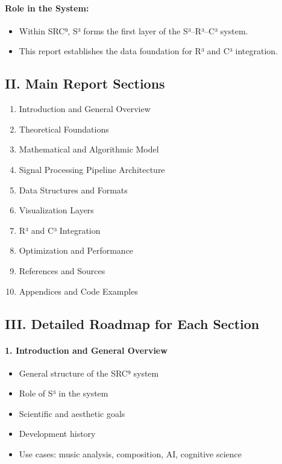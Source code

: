 \paragraph{Role in the System:}

\begin{itemize}
    \item Within SRC⁹, S³ forms the first layer of the S³–R³–C³ system.
    \item This report establishes the data foundation for R³ and C³ integration.
\end{itemize}

\subsection*{II. Main Report Sections}

\begin{enumerate}
    \item Introduction and General Overview
    \item Theoretical Foundations
    \item Mathematical and Algorithmic Model
    \item Signal Processing Pipeline Architecture
    \item Data Structures and Formats
    \item Visualization Layers
    \item R³ and C³ Integration
    \item Optimization and Performance
    \item References and Sources
    \item Appendices and Code Examples
\end{enumerate}

\subsection*{III. Detailed Roadmap for Each Section}

\paragraph{1. Introduction and General Overview}
\begin{itemize}
    \item General structure of the SRC⁹ system
    \item Role of S³ in the system
    \item Scientific and aesthetic goals
    \item Development history
    \item Use cases: music analysis, composition, AI, cognitive science
\end{itemize}

